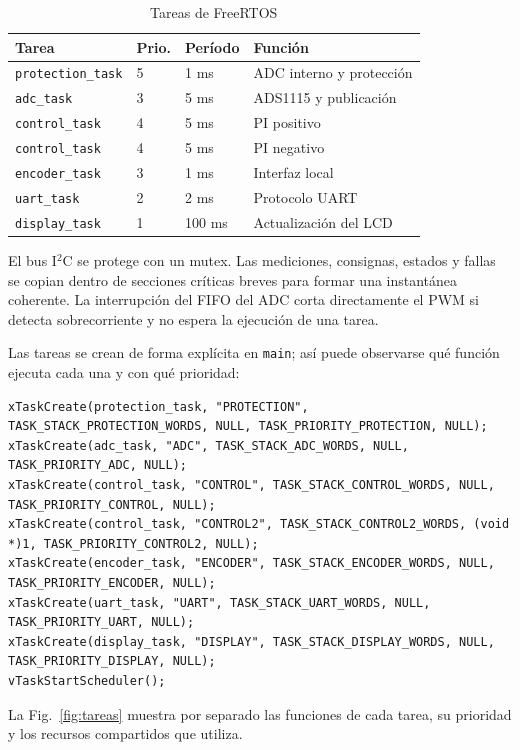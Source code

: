 \documentclass[conference]{IEEEtran}
\begin{document}
\begin{table}[!t]
\caption{Tareas de FreeRTOS}
\label{tab:tareas}
\centering
\scriptsize
\begin{tabular}{@{}llll@{}}
\toprule
\textbf{Tarea} & \textbf{Prio.} & \textbf{Período} & \textbf{Función} \\
\midrule
\texttt{protection\_task} & 5 & 1 ms & ADC interno y protección \\
\texttt{adc\_task} & 3 & 5 ms & ADS1115 y publicación \\
\texttt{control\_task} & 4 & 5 ms & PI positivo \\
\texttt{control\_task} & 4 & 5 ms & PI negativo \\
\texttt{encoder\_task} & 3 & 1 ms & Interfaz local \\
\texttt{uart\_task} & 2 & 2 ms & Protocolo UART \\
\texttt{display\_task} & 1 & 100 ms & Actualización del LCD \\
\bottomrule
\end{tabular}
\end{table}

El bus I$^2$C se protege con un mutex. Las mediciones, consignas, estados y fallas se copian dentro de secciones críticas breves para formar una instantánea coherente. La interrupción del FIFO del ADC corta directamente el PWM si detecta sobrecorriente y no espera la ejecución de una tarea.

Las tareas se crean de forma explícita en \texttt{main}; así puede observarse qué función ejecuta cada una y con qué prioridad:

\begin{lstlisting}[caption={Creación de las siete tareas del programa principal.}]
xTaskCreate(protection_task, "PROTECTION", TASK_STACK_PROTECTION_WORDS, NULL, TASK_PRIORITY_PROTECTION, NULL);
xTaskCreate(adc_task, "ADC", TASK_STACK_ADC_WORDS, NULL, TASK_PRIORITY_ADC, NULL);
xTaskCreate(control_task, "CONTROL", TASK_STACK_CONTROL_WORDS, NULL, TASK_PRIORITY_CONTROL, NULL);
xTaskCreate(control_task, "CONTROL2", TASK_STACK_CONTROL2_WORDS, (void *)1, TASK_PRIORITY_CONTROL2, NULL);
xTaskCreate(encoder_task, "ENCODER", TASK_STACK_ENCODER_WORDS, NULL, TASK_PRIORITY_ENCODER, NULL);
xTaskCreate(uart_task, "UART", TASK_STACK_UART_WORDS, NULL, TASK_PRIORITY_UART, NULL);
xTaskCreate(display_task, "DISPLAY", TASK_STACK_DISPLAY_WORDS, NULL, TASK_PRIORITY_DISPLAY, NULL);
vTaskStartScheduler();
\end{lstlisting}

La Fig.~\ref{fig:tareas} muestra por separado las funciones de cada tarea, su prioridad y los recursos compartidos que utiliza.
\end{document}
